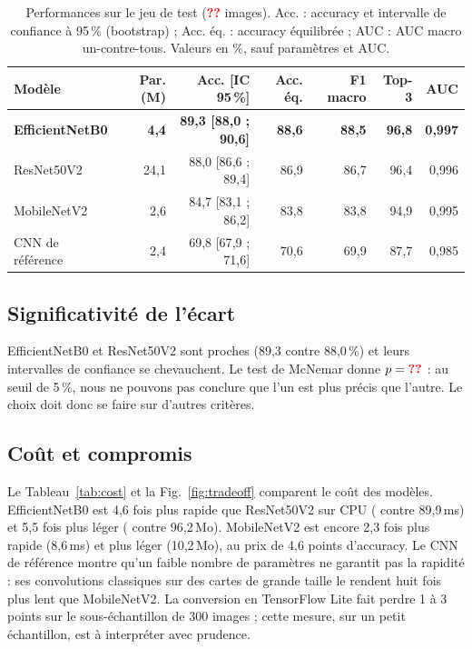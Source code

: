 \documentclass[conference]{IEEEtran}
\newcommand{\todo}{\textcolor{red}{\textbf{??}}}
\newcommand{\nTest}{\todo}\newcommand{\knnBaseline}{\todo}\newcommand{\bestModel}{\todo}
\begin{document}
\begin{table}[!t]
\caption{Performances sur le jeu de test (\nTest{} images). Acc. : accuracy et intervalle de confiance à 95\,\% (bootstrap) ; Acc. éq. : accuracy équilibrée ; AUC : AUC macro un-contre-tous. Valeurs en \%, sauf paramètres et AUC.}
\label{tab:res}
\centering\footnotesize\setlength{\tabcolsep}{6pt}
\begin{tabular}{@{}lrrrrrr@{}}
\toprule
Modèle & Par. (M) & Acc. [IC 95\,\%] & Acc. éq. & F1 macro & Top-3 & AUC\\
\midrule
\textbf{EfficientNetB0} & \textbf{4{,}4} & \textbf{89{,}3 [88{,}0 ; 90{,}6]} & \textbf{88{,}6} & \textbf{88{,}5} & \textbf{96{,}8} & \textbf{0{,}997} \\
ResNet50V2 & 24{,}1 & 88{,}0 [86{,}6 ; 89{,}4] & 86{,}9 & 86{,}7 & 96{,}4 & 0{,}996 \\
MobileNetV2 & 2{,}6 & 84{,}7 [83{,}1 ; 86{,}2] & 83{,}8 & 83{,}8 & 94{,}9 & 0{,}995 \\
CNN de référence & 2{,}4 & 69{,}8 [67{,}9 ; 71{,}6] & 70{,}6 & 69{,}9 & 87{,}7 & 0{,}985 \\
\bottomrule
\end{tabular}
\end{table}

\subsection{Significativité de l'écart}
EfficientNetB0 et ResNet50V2 sont proches (89,3 contre 88,0\,\%) et leurs intervalles de confiance se chevauchent. Le test de McNemar donne $p = \mcnemarP$ : au seuil de 5\,\%, nous ne pouvons pas conclure que l'un est plus précis que l'autre. Le choix doit donc se faire sur d'autres critères.

\subsection{Coût et compromis}
Le Tableau~\ref{tab:cost} et la Fig.~\ref{fig:tradeoff} comparent le coût des modèles. EfficientNetB0 est 4,6 fois plus rapide que ResNet50V2 sur CPU (\bestCpu{} contre 89,9\,ms) et 5,5 fois plus léger (\bestSize{} contre 96,2\,Mo). MobileNetV2 est encore 2,3 fois plus rapide (8,6\,ms) et plus léger (10,2\,Mo), au prix de 4,6 points d'accuracy. Le CNN de référence montre qu'un faible nombre de paramètres ne garantit pas la rapidité : ses convolutions classiques sur des cartes de grande taille le rendent huit fois plus lent que MobileNetV2. La conversion en TensorFlow Lite fait perdre 1 à 3 points sur le sous-échantillon de 300 images ; cette mesure, sur un petit échantillon, est à interpréter avec prudence.
\end{document}
